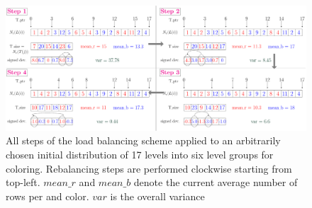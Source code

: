    \begin{figure}[t]
   	\centering
   	\includegraphics[height=0.22\textheight,width=\textwidth]{pics/load_balancing/lb_alg/lb_all}
   	\caption{All steps of the load balancing scheme applied to an arbitrarily chosen initial distribution of 17 levels into six level groups for \DTWO coloring. Rebalancing steps are performed clockwise starting from top-left. $mean\_r$ and $mean\_b$ denote the current average number of rows per \levelGroup and color. $var$ is the overall  variance}
   	\label{fig:lb_alg}
   \end{figure}
   
